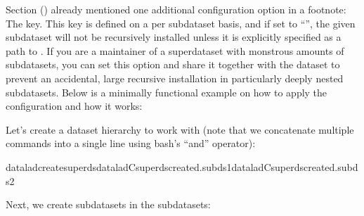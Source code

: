 \sphinxAtStartPar
Section {\hyperref[\detokenize{basics/101-116-sharelocal:sharelocal1}]{}} () already mentioned one additional configuration option in a footnote: The  key.
This key is defined on a per subdataset basis, and if set to “”, the given subdataset will not be recursively installed unless it is explicitly specified as a path to .
If you are a maintainer of a superdataset with monstrous amounts of subdatasets, you can set this option and share it together with the dataset to prevent an accidental, large recursive installation in particularly deeply nested subdatasets.
Below is a minimally functional example on how to apply the configuration and how it works:

\sphinxAtStartPar
Let’s create a dataset hierarchy to work with (note that we concatenate multiple commands into a single line using bash’s “and” \sphinxcode{\sphinxupquote{\&\&}} operator):

\newpage

\begin{sphinxVerbatim}[commandchars=\\\{\}]
dataladcreatesuperdsdatalad\PYGZhy{}Csuperdscreate\PYGZhy{}d.subds1datalad\PYGZhy{}Csuperdscreate\PYGZhy{}d.subds2
\end{sphinxVerbatim}

\sphinxAtStartPar
Next, we create subdatasets in the subdatasets:

